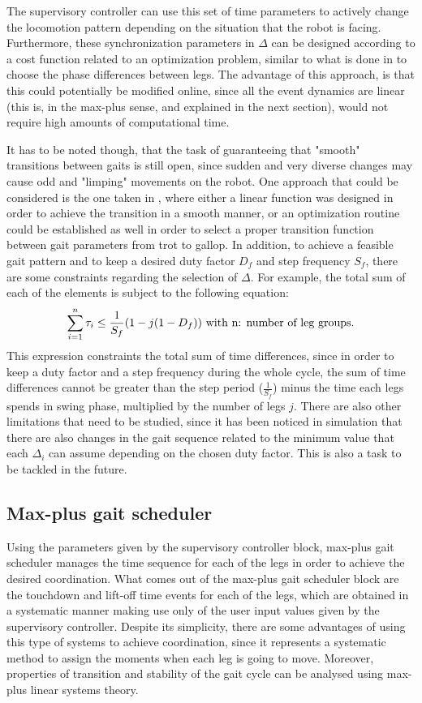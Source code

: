 \documentclass[main.tex]{subfiles}
\begin{document}
The supervisory controller can use this set of time parameters to actively change the locomotion pattern depending on the situation that the robot is facing. Furthermore, these synchronization parameters in $\Delta$ can be designed according to a cost function related to an optimization problem, similar to what is done in \cite{Park2015} to choose the phase differences between legs. The advantage of this approach, is that this could potentially be modified online, since all the event dynamics are linear (this is, in the max-plus sense, and explained in the next section), would not require high amounts of computational time. 

It has to be noted though, that the task of guaranteeing that "smooth" transitions between gaits is still open, since sudden and very diverse changes may cause odd and "limping" movements on the robot. One approach that could be considered is the one taken in \cite{Park2015,Asif2011}, where either a linear function was designed in order to achieve the transition in a smooth manner, or an optimization routine could be established as well in order to select a proper transition function between gait parameters from trot to gallop. In addition, to achieve a feasible gait pattern and to keep a desired duty factor $D_f$ and step frequency $S_f$, there are some constraints regarding the selection of $\Delta$. For example, the total sum of each of the elements is subject to the following equation:
\begin{equation}
\sum_{i = 1}^{n} \tau_i \leq \frac{1}{S_f}(1 - j(1 - D_f)) \textmd{ with n: number of leg groups}.
\end{equation}
This expression constraints the total sum of time differences, since in order to keep a duty factor and a step frequency during the whole cycle, the sum of time differences cannot be greater than the step period ($\frac{1}{S_f}$)  minus the time each legs spends in swing phase, multiplied by the number of legs $j$. There are also other limitations that need to be studied, since it has been noticed in simulation that there are also changes in the gait sequence related to the minimum value that each $\Delta_i$ can assume depending on the chosen duty factor. This is also a task to be tackled in the future.
\subsection{Max-plus gait scheduler}\label{section:MaxPlus}
Using the parameters given by the supervisory controller block, max-plus gait scheduler manages the time sequence for each of the legs in order to achieve the desired coordination. What comes out of the max-plus gait scheduler block are the touchdown and lift-off time events for each of the legs, which are obtained in a systematic manner making use only of the user input values given by the supervisory controller. Despite its simplicity, there are some advantages of using this type of systems to achieve coordination, since it represents a systematic method to assign the moments when each leg is going to move. Moreover, properties of transition and stability of the gait cycle can be analysed using max-plus linear systems theory.
\end{document}
